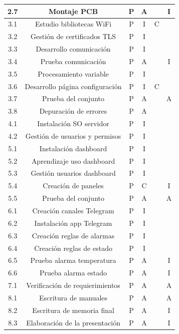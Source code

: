 \documentclass[11pt]{charter}
\begin{document}
\begin{table}[htpb]
{\begin{tabular}{|c|c|c|c|c|c|}
 2.7&Montaje PCB  & P  & A &  & I\\ \hline
 3.1&Estudio bibliotecas WiFi  & P & I & C &\\ \hline
 3.2&Gestión de certificados TLS  & P & I &  &\\ \hline
 3.3&Desarrollo comunicación  & P & I &  &\\ \hline
 3.4&Prueba comunicación  & P & A &  & I\\ \hline
 3.5&Procesamiento variable  & P  & I &  &\\ \hline
 3.6&Desarrollo página configuración & P  & I & C &\\ \hline
 3.7&Prueba del conjunto  & P & A &  & A\\ \hline
 3.8&Depuración de errores  & P & A &  &\\ \hline
 4.1&Instalación SO servidor  & P & I &  &\\ \hline
 4.2&Gestión de usuarios y permisos & P & I &  &\\ \hline
 5.1&Instalación dashboard  & P & I &  &\\ \hline 
 5.2&Aprendizaje uso dashboard  & P & I &  &\\ \hline
 5.3&Gestión usuarios dashboard  & P & I &  &\\ \hline
 5.4&Creación de paneles  & P & C &  & I\\ \hline
 5.5&Prueba del conjunto  & P & A &  & A\\ \hline
 6.1&Creación canales Telegram  & P & I &  &\\ \hline
 6.2&Instalación app Telegram & P & I &  &  \\ \hline
 6.3&Creación reglas de alarmas & P & I &  &\\ \hline
 6.4&Creación reglas de estado & P & I &  &\\ \hline
 6.5&Prueba alarma temperatura & P & A &  & I\\ \hline
 6.6&Prueba alarma estado & P & A &  & I \\ \hline
 7.1&Verificación de requierimientos & P & A &  & A\\ \hline
 8.1&Escritura de manuales & P & A &  & A\\ \hline
 8.2&Escritura de memoria final & P & A &  & I\\ \hline
 8.3&Elaboración de la presentación & P & A &  & I\\ \hline

\end{tabular}%
}
\end{table}
\end{document}
